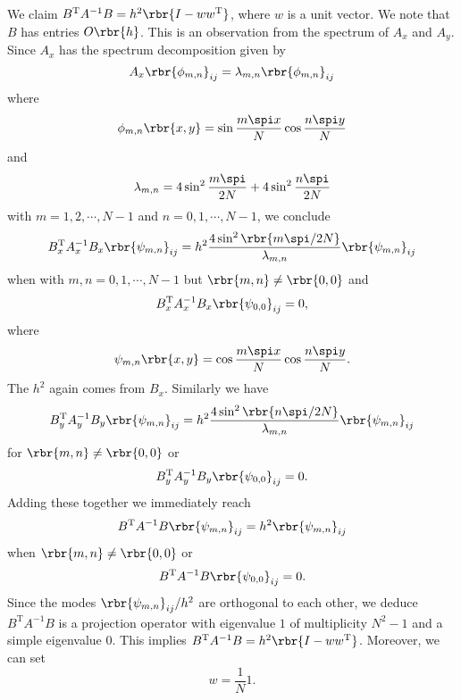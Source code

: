 \documentclass[english, nochinese]{pnote}
\begin{document}
We claim $ B^{\text{T}} A^{-1} B = h^2 \rbr{ I - w w^{\text{T}} } $, where $w$ is a unit vector. We note that $B$ has entries $ O \rbr{h} $. This is an observation from the spectrum of $A_x$ and $A_y$. Since $A_x$ has the spectrum decomposition given by
\begin{equation}
A_x \rbr{ \phi_{ m, n } }_{ i j } = \lambda_{ m, n } \rbr{ \phi_{ m, n } }_{ i j }
\end{equation}
where
\begin{equation}
\phi_{ m, n } \rbr{ x, y } = \sin \frac{ m \spi x }{N} \cos \frac{ n \spi y }{N}
\end{equation}
and
\begin{equation}
\lambda_{ m, n } = 4 \sin^2 \frac{ m \spi }{ 2 N } + 4 \sin^2 \frac{ n \spi }{ 2 N }
\end{equation}
with $ m = 1, 2, \cdots, N - 1 $ and $ n = 0, 1, \cdots, N - 1 $, we conclude
\begin{equation}
B_x^{\text{T}} A_x^{-1} B_x \rbr{ \psi_{ m, n } }_{ i j } = h^2 \frac{ 4 \sin^2 \rbr{ m \spi / 2 N } }{\lambda_{ m, n }} \rbr{ \psi_{ m, n } }_{ i j }
\end{equation}
when with $ m, n = 0, 1, \cdots, N - 1 $ but $ \rbr{ m, n } \neq \rbr{ 0, 0 } $ and
\begin{equation}
B_x^{\text{T}} A_x^{-1} B_x \rbr{ \psi_{ 0, 0 } }_{ i j } = 0,
\end{equation}
where
\begin{equation}
\psi_{ m, n } \rbr{ x, y } = \cos \frac{ m \spi x }{N} \cos \frac{ n \spi y }{N}.
\end{equation}
The $h^2$ again comes from $B_x$. Similarly we have
\begin{equation}
B_y^{\text{T}} A_y^{-1} B_y \rbr{ \psi_{ m, n } }_{ i j } = h^2 \frac{ 4 \sin^2 \rbr{ n \spi / 2 N } }{\lambda_{ m, n }} \rbr{ \psi_{ m, n } }_{ i j }
\end{equation}
for $ \rbr{ m, n } \neq \rbr{ 0, 0 } $ or
\begin{equation}
B_y^{\text{T}} A_y^{-1} B_y \rbr{ \psi_{ 0, 0 } }_{ i j } = 0.
\end{equation}
Adding these together we immediately reach
\begin{equation}
B^{\text{T}} A^{-1} B \rbr{ \psi_{ m, n } }_{ i j } = h^2 \rbr{ \psi_{ m, n } }_{ i j }
\end{equation}
when $ \rbr{ m, n } \neq \rbr{ 0, 0 } $ or
\begin{equation}
B^{\text{T}} A^{-1} B \rbr{ \psi_{ 0, 0 } }_{ i j } = 0.
\end{equation}
Since the modes $ \rbr{ \psi_{ m, n } }_{ i j } / h^2 $ are orthogonal to each other, we deduce $ B^{\text{T}} A^{-1} B $ is a projection operator with eigenvalue $1$ of multiplicity $ N^2 - 1 $ and a simple eigenvalue $0$. This implies $ B^{\text{T}} A^{-1} B = h^2 \rbr{ I - w w^{\text{T}} } $. Moreover, we can set
\begin{equation}
w = \frac{1}{N} 1.
\end{equation}
\end{document}

